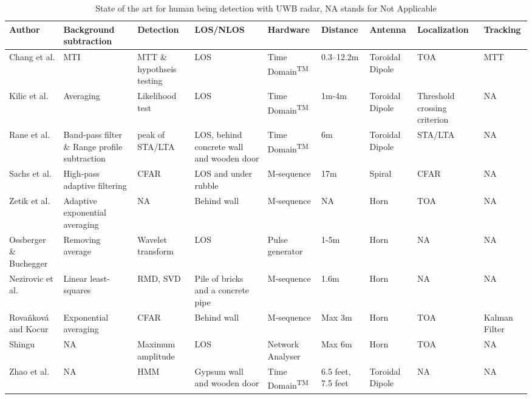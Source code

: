 \begin{table}
    \centering
    \caption{State of the art for human being detection with UWB radar, NA stands for Not Applicable}
    \label{tabel: state of the art}
    \small
\begin{tabularx}{\textwidth}{|p{1.7cm}p{1.7cm}p{1.7cm}p{1.4cm}p{1.3cm}p{1.2cm}p{1.2cm}p{1.5cm}p{1cm}|}

\hline
    Author & Background subtraction & Detection & LOS/NLOS & Hardware& Distance & Antenna & Localization& Tracking
    \\\hline
    \rowcolor{Gray}
    Chang et al.\cite{Chang2009} &	MTI & MTT \& hypothseis testing &LOS &Time Domain\textsuperscript{TM}& 0.3–12.2m& Toroidal Dipole	& TOA	& MTT\\
    
    Kilic et al. \cite{Kilic2013}&Averaging&Likelihood test&LOS&Time Domain\textsuperscript{TM}&1m-4m&Toroidal Dipole&Threshold crossing criterion&NA\\
    \rowcolor{Gray}
    Rane et al. \cite{RaneMovintargetUWB}&	Band-pass filter \& Range profile subtraction	& peak of STA/LTA &LOS, behind concrete wall and wooden door& Time Domain\textsuperscript{TM}&6m& Toroidal Dipole&STA/LTA&NA\\				

    Sachs et al. \cite{Sachs2008} &	High-pass adaptive filtering &	CFAR &	LOS and under rubble & M-sequence & 17m& Spiral &	CFAR &	NA\\
    \rowcolor{Gray}
    Zetik et al. \cite{Zetik} & Adaptive exponential averaging & NA & Behind wall & M-sequence&	NA&		Horn&	TOA & NA\\
    
    Ossberger \& Buchegger \cite{OssbergerRespiratory} & Removing average &	Wavelet transform &	LOS& Pulse generator & 	1-5m &	Horn & NA& NA\\
    \rowcolor{Gray}
    Nezirovic et al. \cite{Nezirovic2010} &	Linear least-squares &	RMD, SVD &	Pile of bricks and a concrete pipe&	 M-sequence & 1.6m & Horn&NA&NA\\			
    
    Rova\v{n}kov\'{a} and Kocur \cite{Rovnakova2013} & Exponential averaging & CFAR &	Behind wall& M-sequence  & Max 3m& Horn& TOA &	Kalman Filter\\
    \rowcolor{Gray}
    
    Shingu \cite{Shingu2008}&	NA&	Maximum amplitude&	LOS&	Network Analyser&	Max 6m	&Horn&	TOA&NA\\
    Zhao et al.\cite{ZhaoHMM}& NA & HMM&	Gypsum wall and wooden door&	Time Domain\textsuperscript{TM}&6.5 feet, 7.5 feet&	Toroidal Dipole&NA&NA\\
    \hline

\end{tabularx}
\end{table}

